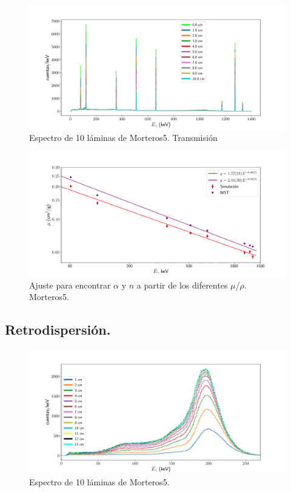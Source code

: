 \begin{figure}[H]
	\centering
	\includegraphics[width=1.0\linewidth]{Kap4/espectro_m5-10Mtrans.pdf}
	\caption{Espectro de 10 láminas de Morteros5. Transmisión}
	\label{fig:espectrom5-10mtrans}
\end{figure}
 
\begin{figure}[H]
	\centering
	\includegraphics[width=1.0\linewidth]{Kap4/mu-trans-m5.pdf}
	\caption{Ajuste para encontrar $\alpha$ y $n$ a partir de los diferentes $\mu$/$\rho$. Morteros5.}
	\label{fig:mu-trans-m5}
\end{figure}
 
 \subsection{Retrodispersión.}
 
\begin{figure}[H]
	\centering
	\includegraphics[width=1.0\linewidth]{Kap4/espectro_m5.pdf}
	\caption{Espectro de 10 láminas de Morteros5.}
	\label{fig:espectrom5}
\end{figure}

